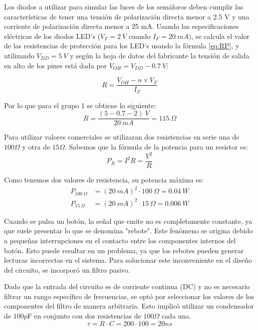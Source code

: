 \documentclass[12pt,letterpaper]{article}     %
\begin{document}
Los diodos a utilizar para simular las luces de los semáforos deben cumplir las características de tener una tensión de polarización directa menor a 2.5 V y una corriente de polarización directa menor a 25 mA. Usando las especificaciones eléctricas de los diodos LED's ($V_{F}=2\:V$ cuando $I_{F}=20\:mA)$, se calcula el valor de las resistencias de protección para los LED's usando la fórmula \eqref{eq:RP}, y utilizando $V_{DD}=5\:V$ y según la hoja de datos del fabricante la tensión de salida en alto de los pines está dada por $V_{OH}=V_{DD}-0.7\:V$:

\begin{equation}
    R = \frac{V_{OH}-n\times V_{F}}{I_{F}}
    \label{eq:RP}
\end{equation}

Por lo que para el grupo 1 se obtiene lo siguiente:
\begin{equation}
    R = \frac{(5-0.7-2)\:V}{20\:mA} = 115\:\Omega
\end{equation}

Para utilizar valores comerciales se utilizaran dos resistencias en serie una de $100 \Omega$ y otra de $15 \Omega$. Sabemos que la fórmula de la potencia para un resistor es:
\begin{equation}
    P_{R} = I^{2}R = \frac{V^{2}}{R}
\end{equation}

Como tenemos dos valores de resistencia, su potencia máxima es:
\begin{align}
    P_{100\:\Omega} &= (20\:mA)^2\cdot100\:\Omega = 0.04\:W \\
    P_{15\:\Omega} &= (20\:mA)^2\cdot15\:\Omega = 0.006\:W
\end{align}

Cuando se pulsa un botón, la señal que emite no es completamente constante, ya que suele presentar lo que se denomina "rebote". Este fenómeno se origina debido a pequeñas interrupciones en el contacto entre los componentes internos del botón. Esto puede resultar en un problema, ya que los rebotes pueden generar lecturas incorrectas en el sistema. Para solucionar este inconveniente en el diseño del circuito, se incorporó un filtro pasivo.

Dado que la entrada del circuito es de corriente continua (DC) y no es necesario filtrar un rango específico de frecuencias, se optó por seleccionar los valores de los componentes del filtro de manera arbitraria. Esto implicó utilizar un condensador de $100 p$F en conjunto con dos resistencias de $100 \Omega$ cada una.
\begin{equation}
    \tau = R\cdot C=200\cdot 100=20 ns
\end{equation}
\end{document}
